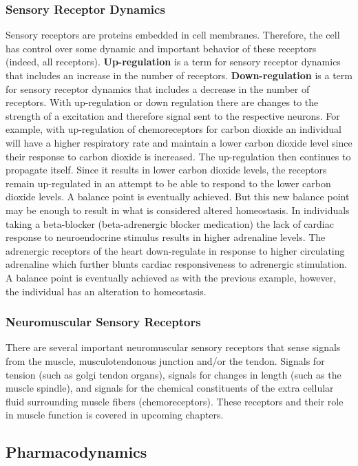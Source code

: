 \subsubsection{Sensory Receptor Dynamics}
Sensory receptors are proteins embedded in cell membranes. Therefore, the cell has control over some dynamic and important behavior of these receptors (indeed, all receptors).  \textbf{Up-regulation} is a term for sensory receptor dynamics that includes an increase in the number of receptors. \textbf{Down-regulation} is a term for sensory receptor dynamics that includes a decrease in the number of receptors. With up-regulation or down regulation there are changes to the strength of a excitation and therefore signal sent to the respective neurons. For example, with up-regulation of chemoreceptors for carbon dioxide an individual will have a higher respiratory rate and maintain a lower carbon dioxide level since their response to carbon dioxide is increased. The up-regulation then continues to propagate itself. Since it results in lower carbon dioxide levels, the receptors remain up-regulated in an attempt to be able to respond to the lower carbon dioxide levels. A balance point is eventually achieved. But this new balance point may be enough to result in what is considered altered homeostasis. In individuals taking a beta-blocker (beta-adrenergic blocker medication) the lack of cardiac response to neuroendocrine stimulus results in higher adrenaline levels. The adrenergic receptors of the heart down-regulate in response to higher circulating adrenaline which further blunts cardiac responsiveness to adrenergic stimulation. A balance point is eventually achieved as with the previous example, however, the individual has an alteration to homeostasis. 

\subsubsection{Neuromuscular Sensory Receptors} 
There are several important neuromuscular sensory receptors that sense signals from the muscle, musculotendonous junction and/or the tendon. Signals for tension (such as golgi tendon organs), signals for changes in length (such as the muscle spindle), and signals for the chemical constituents of the extra cellular fluid surrounding muscle fibers (chemoreceptors). These receptors and their role in muscle function is covered in upcoming chapters.

\subsection{Pharmacodynamics}

